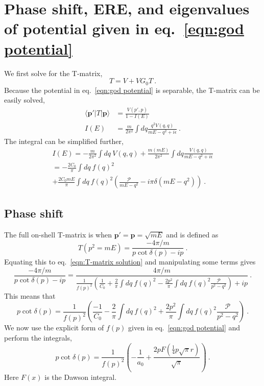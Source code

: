 \documentclass[11pt]{article}
\begin{document}
\appendix
\section{Phase shift, ERE, and eigenvalues of potential given in eq.~\eqref{eqn:god potential}\label{sect:god potential}}
We first solve for the T-matrix,
\begin{displaymath}
T = V+VG_0 T\ .
\end{displaymath}
Because the potential in eq.~\eqref{eqn:god potential} is separable, the T-matrix can be easily solved,
\begin{align}
\langle \bm p'|T|\bm p\rangle &= \frac{V(p',p)}{1-I(E)}\label{eqn:T-matrix solution}\\
I(E)&=\frac{m}{2\pi^2}\int dq\frac{q^2V(q,q)}{mE-q^2+i\epsilon}\ .
\end{align}
The integral can be simplified further,
\begin{multline}
I(E)=-\frac{m}{2\pi^2}\int dq\ V(q,q)+\frac{m(mE)}{2\pi^2}\int dq\frac{V(q,q)}{mE-q^2+i\epsilon}\\
=-\frac{2C_0}{\pi}\int dq\  f(q)^2\\
+\frac{2C_0 mE}{\pi}\int dq\ f(q)^2\left(\frac{\mathcal{P}}{mE-q^2}-i\pi \delta(mE-q^2)\right)
\ .
\end{multline}

\subsection{Phase shift\label{sect:phase shift}}
The full on-shell T-matrix is when $\bm p'=\bm p=\sqrt{mE}$ and is defined as
\begin{equation}
T(p^2=mE)=\frac{-4\pi/m}{p\cot \delta(p)-ip}\ .
\end{equation}
Equating this to eq.~\eqref{eqn:T-matrix solution} and manipulating some terms gives
\begin{equation}
\frac{-4\pi/m}{p\cot \delta(p)-ip}=
\frac{4\pi/m}{\frac{1}{f(p)^2}\left(\frac{1}{C_0}+\frac{2}{\pi}\int dq\  f(q)^2-\frac{2p^2}{\pi}\int dq\ f(q)^2\frac{\mathcal{P}}{p^2-q^2}\right)+ip}\ .
\end{equation}
This means that
\begin{equation}
p\cot\delta(p)=\frac{1}{f(p)^2}\left(\frac{-1}{C_0}-\frac{2}{\pi}\int dq\  f(q)^2+\frac{2p^2}{\pi}\int dq\ f(q)^2\frac{\mathcal{P}}{p^2-q^2}\right)\ .
\end{equation}
We now use the explicit form of $f(p)$ given in eq.~\eqref{eqn:god potential} and perform the integrals,
\begin{equation}
\boxed{
p\cot\delta(p)=\frac{1}{f(p)^2}\left(-\frac{1}{a_0}+\frac{2 p F\left(\frac{1}{4} p \sqrt{\pi } r\right)}{\sqrt{\pi
   }}\right)}\ .
\end{equation}
Here $F(x)$ is the Dawson integral.
\end{document}
